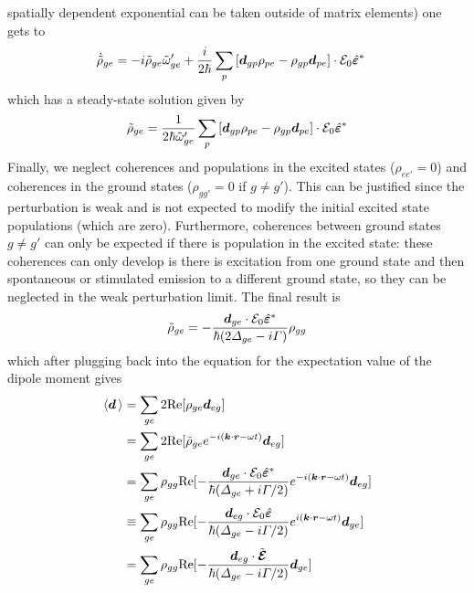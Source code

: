spatially dependent exponential can be taken outside of matrix elements) one
gets to 
\begin{equation} 
\begin{split}
  \dot{\tilde{\rho}}_{ge} & =  
     -i \tilde{\rho}_{ge}\tilde{\omega}'_{ge}   
     + \frac{i}{2\hbar} \sum_{p}\left[ \bm{d}_{gp} \rho_{pe} 
     - \rho_{gp}\bm{d}_{pe}\right] \cdot \mathcal{E}_{0} \hat{\bm{\varepsilon}}^{*}
\end{split} 
\end{equation}
which has a steady-state solution given by 
\begin{equation} 
  \tilde{\rho}_{ge}  = \frac{1}{2 \hbar\tilde{\omega}'_{ge} }  
       \sum_{p}\left[ \bm{d}_{gp} \rho_{pe} 
     - \rho_{gp}\bm{d}_{pe}\right] \cdot \mathcal{E}_{0} \hat{\bm{\varepsilon}}^{*}
\end{equation}
Finally, we neglect coherences and populations in the excited states
($\rho_{ee'}=0$) and coherences in the ground states ($\rho_{gg'}=0$ if $g\neq
g'$).   This can be justified since the perturbation is weak and is not
expected to modify the initial excited state populations (which are zero).
Furthermore, coherences between ground states $g\neq g'$ can only be expected
if there is  population in the excited state: these coherences
can only develop is there is excitation from one ground state and then
spontaneous or stimulated emission to a different ground state, so they
can be neglected in the weak perturbation limit.  The final result is 
\begin{equation} 
  \tilde{\rho}_{ge} 
  =  -\frac{\bm{d}_{ge} \cdot \mathcal{E}_{0} \hat{\bm{\varepsilon}}^{*}  }
       {\hbar (2 \Delta_{ge} - i \Gamma )} \rho_{gg} 
\end{equation}
which after plugging back into the equation for the expectation value of the dipole
moment gives 
\begin{equation}
\begin{split}
   \langle \bm{d}\, \rangle 
   & = \sum_{ge} 2 \text{Re}[ \rho_{ge} \bm{d}_{eg} ] \\
   & = \sum_{ge} 2 \text{Re}[ \tilde{\rho}_{ge}e^{-i(\bm{k}\cdot\bm{r}-\omega t)}\bm{d}_{eg} ]   \\
   & = \sum_{ge} \rho_{gg}\text{Re}[ 
 -\frac{\bm{d}_{ge} \cdot \mathcal{E}_{0} \hat{\bm{\varepsilon}}^{*} }{ \hbar( \Delta_{ge} + i \Gamma/2 )} 
   e^{-i(\bm{k}\cdot\bm{r} - \omega t) } 
 \bm{d}_{eg} ]   \\
   & \equiv \sum_{ge}  \rho_{gg} \text{Re}[ 
 -\frac{\bm{d}_{eg} \cdot \mathcal{E}_{0} \hat{\bm{\varepsilon}} }{ \hbar( \Delta_{ge} -i \Gamma/2 ) } 
   e^{i(\bm{k}\cdot\bm{r} - \omega t) } 
 \bm{d}_{ge} ]   \\
   & = \sum_{ge}  \rho_{gg}  \text{Re}[ 
 -\frac{\bm{d}_{eg} \cdot \tilde{\bm{\mathcal{E}}} }{ \hbar(  \Delta_{ge} -i \Gamma/2 ) } 
 \bm{d}_{ge} ]   \\
\end{split} 
\end{equation}
